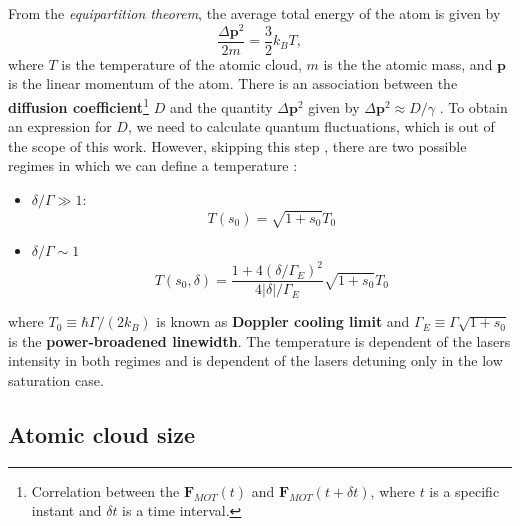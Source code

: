 From the \textit{equipartition theorem}, the average total energy of the atom is given by
\begin{equation}
	\frac{\Delta \mathbf{p}^2}{2m} = \frac{3}{2} k_B T,
\end{equation}
where $ T $ is the temperature of the atomic cloud, $m$ is the the atomic mass, and $ \mathbf{p} $ is the linear momentum of the atom. There is an association between the \textbf{diffusion coefficient}\footnote{Correlation between the $\mathbf{F}_{MOT}(t) $ and $ \mathbf{F}_{MOT}(t + \delta t) $, where $ t $ is a specific instant and $ \delta t $ is a time interval.} $ D $ and the quantity $ \Delta \mathbf{p}^2 $ given by $ \Delta \mathbf{p}^2 \approx D / \gamma $ \cite[Section~2]{perrin2014doppler}. To obtain an expression for $ D $, we need to calculate quantum fluctuations, which is out of the scope of this work. However, skipping this step \cite[Section~2.3]{perrin2014doppler}, there are two possible regimes in which we can define a temperature \cite[Section~V]{loftus2004narrow}:
\begin{itemize}
	\item $ \delta/\Gamma \gg 1 $:
	\begin{equation}
		T(s_0) = \sqrt{1 + s_0} T_0
		\label{eq:Doppler-temperature-high-saturation}
	\end{equation}
	\item $ \delta/\Gamma \sim 1 $
	\begin{equation}
		T(s_0, \delta) = \frac{1 + 4(\delta / \Gamma_E)^2}{4|\delta|/\Gamma_E} \sqrt{1 + s_0} T_0
		\label{eq:Doppler-temperature-low-saturation}
	\end{equation}
\end{itemize}
where $ T_0 \equiv \hbar \Gamma / (2 k_B) $ is known as \textbf{Doppler cooling limit} and $ \Gamma_{E} \equiv \Gamma \sqrt{1 + s_0} $ is the \textbf{power-broadened linewidth}. The temperature is dependent of the lasers intensity in both regimes and is dependent of the lasers detuning only in the low saturation case.

\subsection{Atomic cloud size}
\label{sec:MOT-cloud-size}


